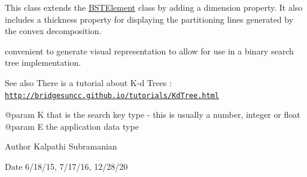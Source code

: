 This class extends the \hyperlink{classbridges_1_1datastructure_1_1_b_s_t_element}{B\+S\+T\+Element} class by adding a dimension property. It also includes a thickness property for displaying the partitioning lines generated by the convex decomposition.

convenient to generate visual representation to allow for use in a binary search tree implementation.

\begin{DoxySeeAlso}{See also}
There is a tutorial about K-\/d Trees \+: \href{http://bridgesuncc.github.io/tutorials/KdTree.html}{\tt http\+://bridgesuncc.\+github.\+io/tutorials/\+Kd\+Tree.\+html} \begin{DoxyVerb} @param K that is the search key type - this is usually a number, integer
    or float
 @param E the application data type
\end{DoxyVerb}

\end{DoxySeeAlso}
\begin{DoxyAuthor}{Author}
Kalpathi Subramanian 
\end{DoxyAuthor}
\begin{DoxyDate}{Date}
6/18/15, 7/17/16, 12/28/20 
\end{DoxyDate}

